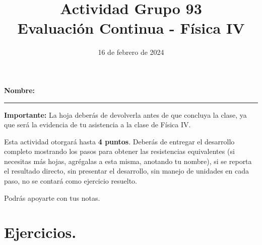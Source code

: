\documentclass[14pt]{extarticle}
\title{\vspace*{-2cm} Actividad Grupo 93 \\  Evaluación Continua - Física IV\vspace{-5ex}}
\date{16 de febrero de 2024}
\begin{document}
\maketitle

\textbf{Nombre:} \rule{8cm}{0.1mm}

\vspace*{0.75cm}
\textbf{Importante: } La hoja deberás de devolverla antes de que concluya la clase, ya que será la evidencia de tu asistencia a la clase de Física IV.

\vspace*{0.5cm}
Esta actividad otorgará hasta \textbf{4 puntos}. Deberás de entregar el desarrollo completo mostrando los pasos para obtener las resistencias equivalentes (si necesitas más hojas, agrégalas a esta misma, anotando tu nombre), si se reporta el resultado directo, sin presentar el desarrollo, sin manejo de unidades en cada paso, no se contará como ejercicio resuelto.

\vspace*{0.75cm}
Podrás apoyarte con tus notas.

\section{Ejercicios.}
\end{document}
